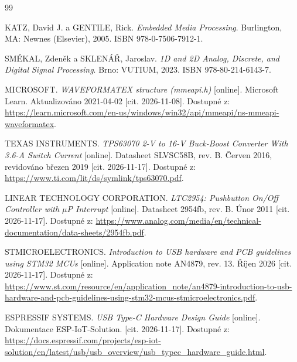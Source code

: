 \begin{thebibliography}{99}




    KATZ, David J. a GENTILE, Rick.
    \emph{Embedded Media Processing}.
    Burlington, MA: Newnes (Elsevier), 2005.
    ISBN 978-0-7506-7912-1.

    SMÉKAL, Zdeněk a SKLENÁŘ, Jaroslav.
    \emph{1D and 2D Analog, Discrete, and Digital Signal Processing}.
    Brno: VUTIUM, 2023.
    ISBN 978-80-214-6143-7.

    MICROSOFT.
    \emph{WAVEFORMATEX structure (mmeapi.h)} [online].
    Microsoft Learn.
    Aktualizováno 2021-04-02 [cit. 2026-11-08].
    Dostupné z:
    \url{https://learn.microsoft.com/en-us/windows/win32/api/mmeapi/ns-mmeapi-waveformatex}.


    TEXAS INSTRUMENTS.
    \emph{TPS63070 2-V to 16-V Buck-Boost Converter With
    3.6-A Switch Current} [online].
    Datasheet SLVSC58B, rev. B.
    Červen 2016, revidováno březen 2019 [cit. 2026-11-17].
    Dostupné z:
    \url{https://www.ti.com/lit/ds/symlink/tps63070.pdf}.

    LINEAR TECHNOLOGY CORPORATION.
    \emph{LTC2954: Pushbutton On/Off Controller with
    $\mu$P Interrupt} [online].
    Datasheet 2954fb, rev. B.
    Únor 2011 [cit. 2026-11-17].
    Dostupné z:
    \url{https://www.analog.com/media/en/technical-documentation/data-sheets/2954fb.pdf}.


    STMICROELECTRONICS.
    \emph{Introduction to USB hardware and PCB guidelines
    using STM32 MCUs} [online].
    Application note AN4879, rev. 13.
    Říjen 2026 [cit. 2026-11-17].
    Dostupné z:
    \url{https://www.st.com/resource/en/application_note/an4879-introduction-to-usb-hardware-and-pcb-guidelines-using-stm32-mcus-stmicroelectronics.pdf}.

    ESPRESSIF SYSTEMS.
    \emph{USB Type-C Hardware Design Guide} [online].
    Dokumentace ESP-IoT-Solution.
    [cit. 2026-11-17].
    Dostupné z:
    \url{https://docs.espressif.com/projects/esp-iot-solution/en/latest/usb/usb_overview/usb_typec_hardware_guide.html}.


\end{thebibliography}
